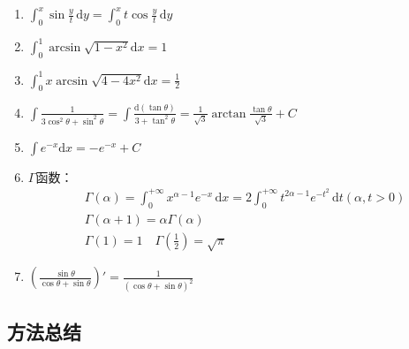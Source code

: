 \documentclass[../book.tex]{subfiles}
\begin{document}
    \begin{enumerate}
        \item $\displaystyle\int_0^x \sin \frac{y}{t}\,\mathrm{d}y = \int_0^x t\cos \frac{y}{t}\,\mathrm{d}y$
        \item $\displaystyle\int_0^1 \arcsin \sqrt {1-x^2}\mathrm{d}x = 1$
        \item $\displaystyle\int_0^1 x\arcsin \sqrt {4-4x^2}\mathrm{d}x = \frac{1}{2}$
        \item $\displaystyle\int \frac{1}{3\cos^2 \theta + \sin^2 \theta} = \int \frac{\mathrm{d}(\tan \theta)}{3 + \tan^2 \theta} = \frac{1}{\sqrt {3}}\arctan\frac{\tan \theta}{\sqrt {3}} + C$
        \item $\displaystyle\int e^{-x}\mathrm{d}x = -e^{-x} + C$
        \item $\Gamma$函数：
        \[
            \begin{aligned}
                &\Gamma(\alpha) = \int_{0}^{+\infty} x^{\alpha-1} e^{-x}\,\mathrm{d}x = 2\int_{0}^{+\infty} t^{2\alpha-1} e^{-t^2}\,\mathrm{d}t (\alpha, t > 0) \\
                &\Gamma(\alpha+1) = \alpha \Gamma(\alpha) \\
                &\Gamma(1) = 1 \quad \Gamma\!\left(\frac{1}{2}\right) = \sqrt{\pi}
            \end{aligned}
        \]
        \item $\displaystyle(\frac{\sin \theta}{\cos \theta + \sin \theta})' = \frac{1}{(\cos \theta + \sin \theta)^2}$
    \end{enumerate}

    \subsection{方法总结}
\end{document}
